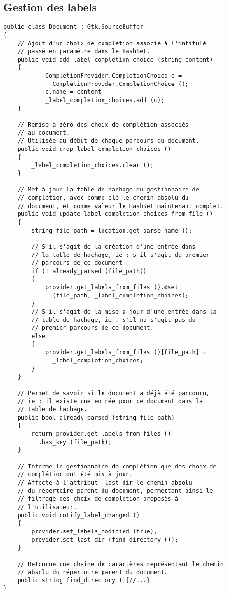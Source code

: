\documentclass[a4paper,11pt]{report}
\begin{document}
\subsection{Gestion des labels}
\label{ssec:gestion_des_labels}

\begin{lstlisting}[frame=single]
public class Document : Gtk.SourceBuffer
{
    // Ajout d'un choix de complétion associé à l'intitulé
    // passé en paramètre dans le HashSet.
    public void add_label_completion_choice (string content)
    {
            CompletionProvider.CompletionChoice c = 
              CompletionProvider.CompletionChoice ();
            c.name = content;
            _label_completion_choices.add (c);
    }
    
    // Remise à zéro des choix de complétion associés
    // au document.
    // Utilisée au début de chaque parcours du document.
    public void drop_label_completion_choices ()
    {
        _label_completion_choices.clear ();
    }
    
    // Met à jour la table de hachage du gestionnaire de
    // complétion, avec comme clé le chemin absolu du
    // document, et comme valeur le HashSet maintenant complet.
    public void update_label_completion_choices_from_file ()
    {
        string file_path = location.get_parse_name ();
        
        // S'il s'agit de la création d'une entrée dans
        // la table de hachage, ie : s'il s'agit du premier
        // parcours de ce document.
        if (! already_parsed (file_path))
        {
            provider.get_labels_from_files ().@set
              (file_path, _label_completion_choices);
        }
        // S'il s'agit de la mise à jour d'une entrée dans la
        // table de hachage, ie : s'il ne s'agit pas du
        // premier parcours de ce document.
        else
        {
            provider.get_labels_from_files ()[file_path] =
              _label_completion_choices;
        }
    }
        
    // Permet de savoir si le document a déjà été parcouru,
    // ie : il existe une entrée pour ce document dans la
    // table de hachage.
    public bool already_parsed (string file_path)
    {
        return provider.get_labels_from_files ()
          .has_key (file_path);
    }
    
    // Informe le gestionnaire de complétion que des choix de
    // complétion ont été mis à jour.
    // Affecte à l'attribut _last_dir le chemin absolu
    // du répertoire parent du document, permettant ainsi le
    // filtrage des choix de complétion proposés à
    // l'utilisateur.
    public void notify_label_changed ()
    {
        provider.set_labels_modified (true);
        provider.set_last_dir (find_directory ());
    }
    
    // Retourne une chaîne de caractères représentant le chemin
    // absolu du répertoire parent du document.
    public string find_directory (){//...}
}
\end{lstlisting}
\end{document}
